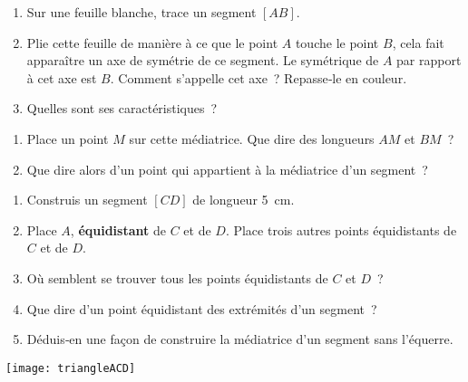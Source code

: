 \begin{activite}

 \begin{partie}
 
 \begin{enumerate}
  \item Sur une feuille blanche, trace un segment $[AB]$.
  \item Plie cette feuille de manière à ce que le point $A$ touche le point $B$, cela fait apparaître un axe de symétrie de ce segment. Le symétrique de $A$ par rapport à cet axe est $B$. Comment s'appelle cet axe ? Repasse‑le en couleur.
  \item Quelles sont ses caractéristiques ?
  \end{enumerate}
  
  \end{partie}
  
 \begin{partie}
 
 \begin{enumerate}
  \item Place un point $M$ sur cette médiatrice. Que dire des longueurs $AM$ et $BM$ ?
  \item Que dire alors d'un point qui appartient à la médiatrice d'un segment ?
  \end{enumerate}
  
  \end{partie}
  
 \begin{partie}
 
 \begin{minipage}[c]{0.76\linewidth}
 \begin {enumerate}
  \item Construis un segment $[CD]$ de longueur 5 cm. 
  \item Place $A$, \textbf{équidistant} de $C$ et de $D$. Place trois autres points équidistants de $C$ et de $D$. 
  \item Où semblent se trouver tous les points équidistants de $C$ et $D$ ?
  \item Que dire d'un point équidistant des extrémités d'un segment ?
  \item Déduis‑en une façon de construire la médiatrice d'un segment sans l'équerre. 
  \end{enumerate} 
  \end{minipage} \hfill %
 \begin{minipage}[c]{0.2\linewidth}
 \texttt{[image: triangleACD]}
  \end{minipage} \\
  
 \end{partie}

\end{activite}

